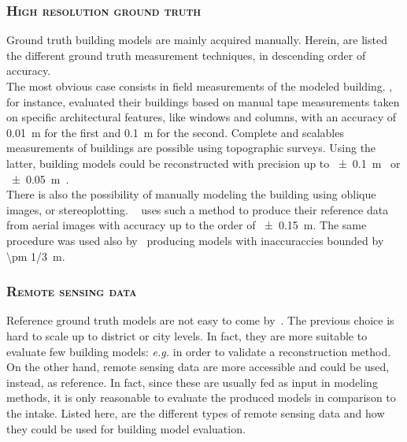         \subsubsection{\textsc{High resolution ground truth}}
            Ground truth building models are mainly acquired manually.
            Herein, are listed the different ground truth measurement techniques, in descending order of accuracy.\\

            The most obvious case consists in field measurements of the modeled building.
            \textcite{dick2004modelling}, for instance, evaluated their buildings based on manual tape measurements taken on specific architectural features, like windows and columns, with an accuracy of \SI{0.01}{\m} for the first and \SI{0.1}{\m} for the second.
            Complete and scalables measurements of buildings are possible using topographic surveys.
            Using the latter, building models could be reconstructed with precision up to \SI{\pm 0.1}{\m}~\parencite{henricsson19973} or \SI{\pm 0.05}{\m}~\parencite{vogtle2003quality}.\\
            There is also the possibility of manually modeling the building using oblique images, or stereoplotting.
            ~\textcite{zebedin2008fusion} uses such a method to produce their reference data from aerial images with accuracy up to the order of \SI{\pm 0.15}{\m}.
            The same procedure was used also by~\textcite{jaynes2003recognition} producing models with inaccuraccies bounded by \SI{\pm 1/3}{\m}.

        \subsubsection{\textsc{Remote sensing data}}
            Reference ground truth models are not easy to come by~\parencite{schuster2003new}.
            The previous choice is hard to scale up to district or city levels.
            In fact, they are more suitable to evaluate few building models: \textit{e.g.} in order to validate a reconstruction method.
            On the other hand, remote sensing data are more accessible and could be used, instead, as reference.
            In fact, since these are usually fed as input in modeling methods, it is only reasonable to evaluate the produced models in comparison to the intake.
            Listed here, are the different types of remote sensing data and how they could be used for building model evaluation.\\

